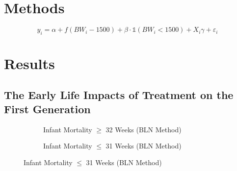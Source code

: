 \documentclass[11pt]{article}
\begin{document}
\begin{spacing}{1.5}
  
  
  
  
  

  
  \clearpage
  \section{Methods}

  \begin{equation}
    y_i = \alpha + f(BW_i-1500) + \beta \cdot \mathbb{1}(BW_i<1500)+X_i\gamma + \varepsilon_i
  \end{equation}

  \citet{Almondetal2010,Bharadwajetal2013}

  \citet{Calonicoetal2020a,Calonicoetal2014}
  
  \citet{Barrecaetal2011}

  \citet{RomanoWolf2005}
  
  \clearpage
  \section{Results}
  \subsection{The Early Life Impacts of Treatment on the First Generation}
  \begin{figure}[htpb!]
    \caption{Birthweight Assignment Thresholds and Infant Mortality}
    \label{fig:IMR}
    \begin{subfigure}{.45\textwidth}
      \centering
      \caption{Infant Mortality $\geq$ 32 Weeks (BLN Method)}
      \label{fig:IMRBLN32}
    \end{subfigure}
    \begin{subfigure}{.45\textwidth}
      \centering
      \caption{Infant Mortality $\leq$ 31 Weeks (BLN Method)}
      \label{fig:IMRBLN31}
    \end{subfigure}


\end{figure}
\end{spacing}
\end{document}
